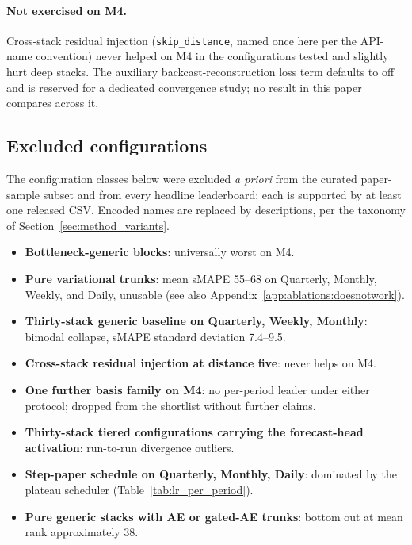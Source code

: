 \paragraph{Not exercised on M4.} Cross-stack residual injection
(\texttt{skip\_distance}, named once here per the API-name convention)
never helped on M4 in the configurations tested and slightly hurt deep
stacks. The auxiliary backcast-reconstruction loss term defaults to off and
is reserved for a dedicated convergence study; no result in this paper
compares across it.

\subsection{Excluded configurations}
\label{app:hyperparams:droplist}

The configuration classes below were excluded \emph{a priori} from the
curated paper-sample subset and from every headline leaderboard; each is
supported by at least one released CSV. Encoded names are replaced by
descriptions, per the taxonomy of Section~\ref{sec:method_variants}.

\begin{itemize}\itemsep -1pt
\item \textbf{Bottleneck-generic blocks}: universally worst on M4.
\item \textbf{Pure variational trunks}: mean sMAPE 55--68 on Quarterly,
      Monthly, Weekly, and Daily, unusable (see also
      Appendix~\ref{app:ablations:doesnotwork}).
\item \textbf{Thirty-stack generic baseline on Quarterly, Weekly, Monthly}:
      bimodal collapse, sMAPE standard deviation 7.4--9.5.
\item \textbf{Cross-stack residual injection at distance five}: never helps
      on M4.
\item \textbf{One further basis family on M4}: no per-period leader under
      either protocol; dropped from the shortlist without further claims.
\item \textbf{Thirty-stack tiered configurations carrying the forecast-head
      activation}: run-to-run divergence outliers.
\item \textbf{Step-paper schedule on Quarterly, Monthly, Daily}: dominated
      by the plateau scheduler (Table~\ref{tab:lr_per_period}).
\item \textbf{Pure generic stacks with AE or gated-AE trunks}: bottom out
      at mean rank approximately 38.
\end{itemize}


